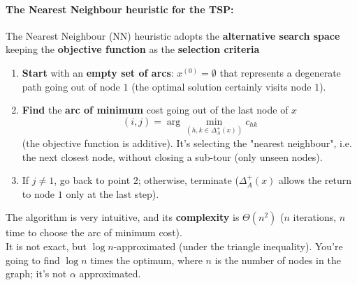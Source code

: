 \newpage

\paragraph{The Nearest Neighbour heuristic for the TSP:} The Nearest Neighbour (NN) heuristic adopts the \textbf{alternative search space} keeping the \textbf{objective function} as the \textbf{selection criteria}
\begin{enumerate}
	\item \textbf{Start} with an \textbf{empty set of arcs}: $x^{(0)} = \emptyset$ that represents a degenerate path going out of node $1$ (the optimal solution certainly visits node $1$).\\
	
	\item \textbf{Find} the \textbf{arc of minimum} cost going out of the last node of $x$
	$$ (i,j) = \arg \min_{(h,k \in \Delta_A^+ (x))} c_{hk} $$
	(the objective function is additive). It's selecting the "nearest neighbour", i.e. the next closest node, without closing a sub-tour (only unseen nodes).\\
	
	\item If $j \neq 1$, go back to point $2$; otherwise, terminate ($\Delta_A^+ (x)$ allows the return to node $1$ only at the last step).\\
\end{enumerate}

The algorithm is very intuitive, and its \textbf{complexity} is $\Theta (n^2)$ ($n$ iterations, $n$ time to choose the arc of minimum cost).\\

It is not exact, but $\log n$-approximated (under the triangle inequality). You're going to find $\log n$ times the optimum, where $n$ is the number of nodes in the graph; it's not $\alpha$ approximated.\\

\newpage

